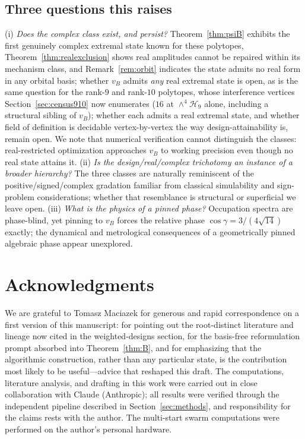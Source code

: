 \documentclass[11pt]{article}
\begin{document}
\subsection*{Three questions this raises}
(i) \emph{Does the complex class exist, and persist?} Theorem~\ref{thm:psiB}
exhibits the first genuinely complex extremal state known for these polytopes,
Theorem~\ref{thm:realexclusion} shows real amplitudes cannot be repaired
within its mechanism class, and Remark~\ref{rem:orbit} indicates the state
admits no real form in any orbital basis; whether $v_B$ admits \emph{any}
real extremal state is open, as is the same question for the rank-$9$ and rank-$10$ polytopes, whose interference vertices Section~\ref{sec:census910} now enumerates ($16$ at $\wedge^4\mathcal{H}_9$ alone, including a structural sibling of $v_B$); whether each admits a real extremal state, and whether field of definition is decidable vertex-by-vertex the way design-attainability is, remain open. We note that numerical verification cannot
distinguish the classes: real-restricted optimization approaches $v_B$ to
working precision even though no real state attains it. (ii) \emph{Is the
design/real/complex trichotomy an instance of a broader hierarchy?} The three
classes are naturally reminiscent of the positive/signed/complex gradation
familiar from classical simulability and sign-problem considerations; whether
that resemblance is structural or superficial we leave open. (iii)
\emph{What is the physics of a pinned phase?} Occupation spectra are
phase-blind, yet pinning to $v_B$ forces the relative phase
$\cos\gamma = 3/(4\sqrt{14})$ exactly; the dynamical and metrological
consequences of a geometrically pinned algebraic phase appear unexplored.

\section*{Acknowledgments}
We are grateful to Tomasz Maciazek for generous and rapid
correspondence on a first version of this manuscript: for pointing out the
root-distinct literature and lineage now cited in
the weighted-designs section, for the basis-free reformulation prompt
absorbed into Theorem~\ref{thm:B}, and for emphasizing that the algorithmic
construction, rather than any particular state, is the contribution most
likely to be useful---advice that reshaped this draft.
The computations, literature analysis, and drafting in this work were
carried out in close collaboration with Claude (Anthropic); all results
were verified through the independent pipeline described in
Section~\ref{sec:methods}, and responsibility for the claims rests with the
author. The multi-start swarm computations were performed on the author's
personal hardware.
\end{document}
